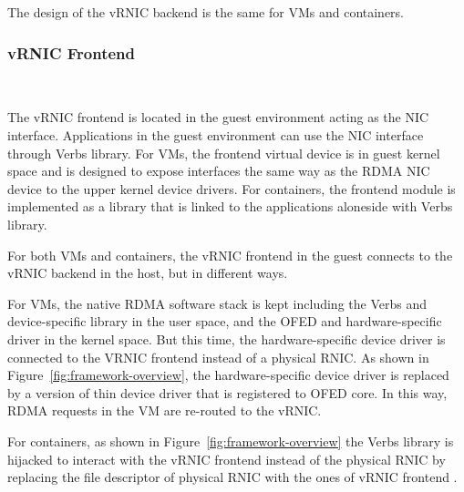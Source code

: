 The design of the vRNIC backend is the same for VMs and containers.

\subsubsection{\textbf{vRNIC Frontend}}

\
\noindent

The vRNIC frontend is located in the guest environment acting as the NIC interface. Applications in the guest environment can use the NIC interface through Verbs library. For VMs, the frontend virtual device is in guest kernel space and is designed to expose interfaces the same way as the RDMA NIC device to the upper kernel device drivers. For containers, the frontend module is implemented as a library that is linked to the applications aloneside with Verbs library.


For both VMs and containers, the vRNIC frontend in the guest connects to the vRNIC backend in the host, but in different ways.

For VMs, the native RDMA software stack is kept including the Verbs and device-specific library in the user space, and the OFED and hardware-specific driver in the kernel space. But this time, the hardware-specific device driver is connected to the VRNIC frontend instead of a physical RNIC. As shown in Figure~\ref{fig:framework-overview}, the hardware-specific device driver is replaced by a \sys version of thin device driver that is registered to OFED core. In this way, RDMA requests in the VM are re-routed to the vRNIC.

For containers, as shown in Figure~\ref{fig:framework-overview} the Verbs library is hijacked to interact with the vRNIC frontend instead of the physical RNIC by replacing the file descriptor of physical RNIC with the ones of vRNIC frontend \cite{kim2019freeflow}.

